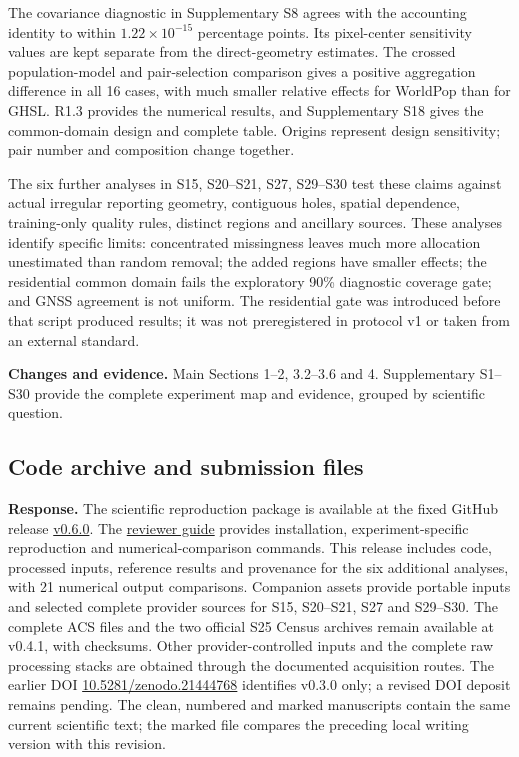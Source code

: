 \documentclass[11pt,a4paper]{article}
\begin{document}
The covariance diagnostic in Supplementary S8 agrees with the accounting identity to within $1.22\times10^{-15}$ percentage points. Its pixel-center sensitivity values are kept separate from the direct-geometry estimates. The crossed population-model and pair-selection comparison gives a positive aggregation difference in all 16 cases, with much smaller relative effects for WorldPop than for GHSL. R1.3 provides the numerical results, and Supplementary S18 gives the common-domain design and complete table. Origins represent design sensitivity; pair number and composition change together.

The six further analyses in S15, S20--S21, S27, S29--S30 test these claims against actual irregular reporting geometry, contiguous holes, spatial dependence, training-only quality rules, distinct regions and ancillary sources. These analyses identify specific limits: concentrated missingness leaves much more allocation unestimated than random removal; the added regions have smaller effects; the residential common domain fails the exploratory 90\% diagnostic coverage gate; and GNSS agreement is not uniform. The residential gate was introduced before that script produced results; it was not preregistered in protocol v1 or taken from an external standard.

\textbf{Changes and evidence.} Main Sections 1--2, 3.2--3.6 and 4. Supplementary S1--S30 provide the complete experiment map and evidence, grouped by scientific question.

\subsection*{Code archive and submission files}

\textbf{Response.} The scientific reproduction package is available at the fixed GitHub release \href{https://github.com/niubisile-wq/openinsar-observability-bias/releases/tag/v0.6.0}{v0.6.0}. The \href{https://github.com/niubisile-wq/openinsar-observability-bias/blob/v0.6.0/revision_2026/README.md}{reviewer guide} provides installation, experiment-specific reproduction and numerical-comparison commands. This release includes code, processed inputs, reference results and provenance for the six additional analyses, with 21 numerical output comparisons. Companion assets provide portable inputs and selected complete provider sources for S15, S20--S21, S27 and S29--S30. The complete ACS files and the two official S25 Census archives remain available at v0.4.1, with checksums. Other provider-controlled inputs and the complete raw processing stacks are obtained through the documented acquisition routes. The earlier DOI \href{https://doi.org/10.5281/zenodo.21444768}{10.5281/zenodo.21444768} identifies v0.3.0 only; a revised DOI deposit remains pending. The clean, numbered and marked manuscripts contain the same current scientific text; the marked file compares the preceding local writing version with this revision.
\end{document}
